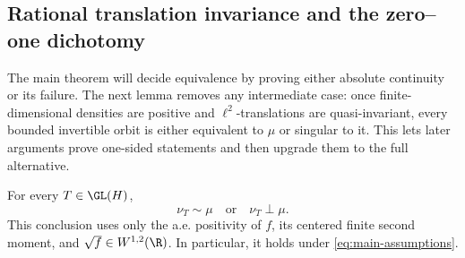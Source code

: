\subsection{Rational translation invariance and the zero--one dichotomy}
\label{sec:translation-dichotomy}

The main theorem will decide equivalence by proving either absolute
continuity or its failure.
The next lemma removes any intermediate case: once finite-dimensional
densities are positive and \(\ell^2\)-translations are quasi-invariant,
every bounded invertible orbit is either equivalent to \(\mu\) or singular
to it.
This lets later arguments prove one-sided statements and then upgrade them
to the full alternative.

\begin{lemma}
\label{lem:orbit-dichotomy}
For every \(T\in\GL(H)\),
\begin{equation}
  \nu_T\sim\mu\quad\text{or}\quad\nu_T\perp\mu.
  \label{eq:orbit-dichotomy}
\end{equation}
This conclusion uses only the a.e. positivity of \(f\), its centered finite second
moment, and \(\sqrt f\in W^{1,2}(\R)\).
In particular, it holds under \eqref{eq:main-assumptions}.
\end{lemma}

